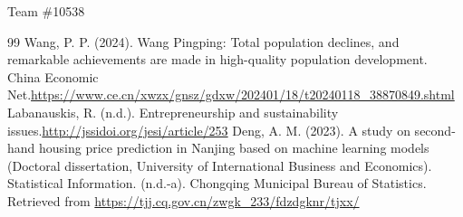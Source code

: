 \documentclass{mcmthesis}
\begin{document}
Team \#10538


\begin{thebibliography}{99}
 Wang, P. P. (2024). Wang Pingping: Total population declines, and remarkable achievements are made in high-quality population development. China Economic Net.\url{https://www.ce.cn/xwzx/gnsz/gdxw/202401/18/t20240118_38870849.shtml}
 Labanauskis, R. (n.d.). Entrepreneurship and sustainability issues.\url{http://jssidoi.org/jesi/article/253}
 Deng, A. M. (2023). A study on second-hand housing price prediction in Nanjing based on machine learning models (Doctoral dissertation, University of International Business and Economics).
 Statistical Information. (n.d.-a). Chongqing Municipal Bureau of Statistics. Retrieved from \url{https://tjj.cq.gov.cn/zwgk_233/fdzdgknr/tjxx/}
\end{thebibliography}
\end{document}
